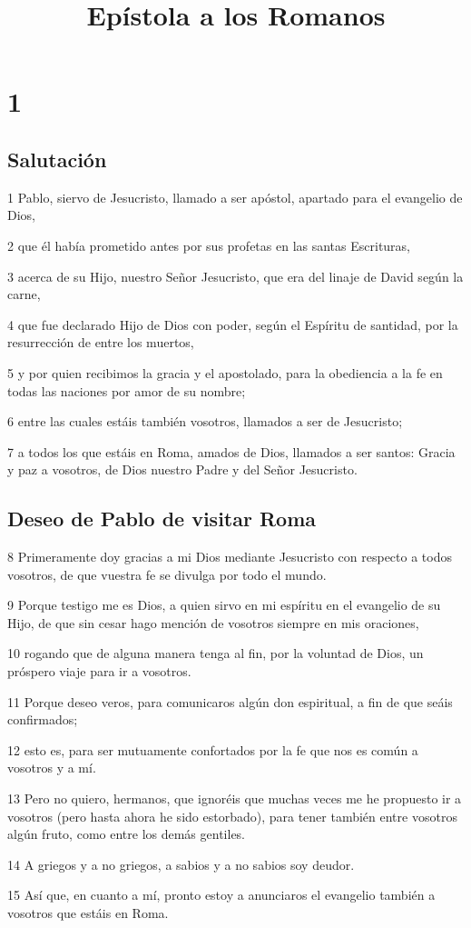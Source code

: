 
\title{Epístola a los Romanos}

\chapter{1}

\section*{Salutación}

\par 1 Pablo, siervo de Jesucristo, llamado a ser apóstol, apartado para el evangelio de Dios,
\par 2 que él había prometido antes por sus profetas en las santas Escrituras,
\par 3 acerca de su Hijo, nuestro Señor Jesucristo, que era del linaje de David según la carne,
\par 4 que fue declarado Hijo de Dios con poder, según el Espíritu de santidad, por la resurrección de entre los muertos,
\par 5 y por quien recibimos la gracia y el apostolado, para la obediencia a la fe en todas las naciones por amor de su nombre;
\par 6 entre las cuales estáis también vosotros, llamados a ser de Jesucristo;
\par 7 a todos los que estáis en Roma, amados de Dios, llamados a ser santos: Gracia y paz a vosotros, de Dios nuestro Padre y del Señor Jesucristo.

\section*{Deseo de Pablo de visitar Roma}

\par 8 Primeramente doy gracias a mi Dios mediante Jesucristo con respecto a todos vosotros, de que vuestra fe se divulga por todo el mundo.
\par 9 Porque testigo me es Dios, a quien sirvo en mi espíritu en el evangelio de su Hijo, de que sin cesar hago mención de vosotros siempre en mis oraciones,
\par 10 rogando que de alguna manera tenga al fin, por la voluntad de Dios, un próspero viaje para ir a vosotros.
\par 11 Porque deseo veros, para comunicaros algún don espiritual, a fin de que seáis confirmados;
\par 12 esto es, para ser mutuamente confortados por la fe que nos es común a vosotros y a mí.
\par 13 Pero no quiero, hermanos, que ignoréis que muchas veces me he propuesto ir a vosotros (pero hasta ahora he sido estorbado), para tener también entre vosotros algún fruto, como entre los demás gentiles.
\par 14 A griegos y a no griegos, a sabios y a no sabios soy deudor.
\par 15 Así que, en cuanto a mí, pronto estoy a anunciaros el evangelio también a vosotros que estáis en Roma.

